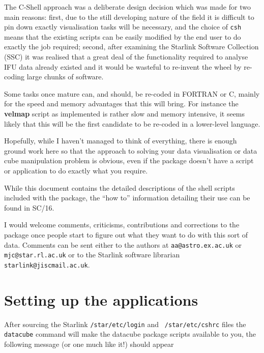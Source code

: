 \documentclass[twoside,11pt]{article}
\newcommand{\htmladdnormallink}[2]{#1}
\newcommand{\htmlref}[2]{#1}
\newcommand{\xref}[3]{#1}
\newcommand{\xlabel}[1]{}
\renewcommand{\_}{\texttt{\symbol{95}}}
\begin{document}
The C-Shell approach was a deliberate design decision which was made
for two main reasons: first, due to the still developing nature of
the field it is difficult to pin down exactly visualisation tasks will
be necessary, and the choice of {\tt csh} means that the existing
scripts can be easily modified by the end user to do exactly the job
required; second, after examining the Starlink Software Collection
(SSC) it was realised that a great deal of the functionality required
to analyse IFU data already existed and it would be wasteful to
re-invent the wheel by re-coding large chunks of software.

Some tasks once mature can, and should, be re-coded in FORTRAN or C,
mainly for the speed and memory advantages that this will bring. For
instance the \htmlref{{\bf velmap}}{velmap} script as implemented is
rather slow and memory intensive, it seems likely that this will be
the first candidate to be re-coded in a lower-level language.

Hopefully, while I haven't managed to think of everything, there is
enough ground work here so that the approach to solving your data
visualisation or data cube manipulation problem is obvious, even if
the package doesn't have a script or application to do exactly what
you require.

While this document contains the detailed descriptions of the shell
scripts included with the package, the ``how to'' information
detailing their use can be found in \xref{SC/16}{sc16}{}.

I would welcome comments, criticisms, contributions and corrections to
the package once people start to figure out what they want to do with
this sort of data.  Comments can be sent either to the authors at
\htmladdnormallink{{\tt aa@astro.ex.ac.uk}}{mailto:aa@astro.ex.ac.uk} or
\htmladdnormallink{{\tt mjc@star.rl.ac.uk}}{mailto:mjc@star.rl.ac.uk} or
to the Starlink software librarian
\htmladdnormallink{{\tt starlink@jiscmail.ac.uk}}{mailto:starlink@jiscmail.ac.uk}.

\section{\xlabel{sun237_starting}Setting up the applications\label{sun237_starting}}

After sourcing the Starlink {\tt /star/etc/login} and {\tt
/star/etc/cshrc} files the {\tt datacube} command will make the
datacube package scripts available to you, the following
message (or one much like it!) should appear
\end{document}
